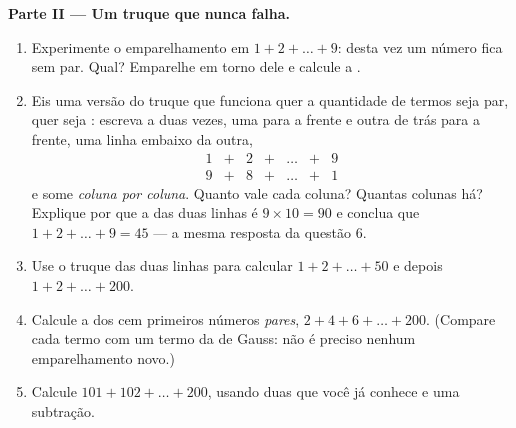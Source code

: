 \begin{problem}
\medskip
\noindent\textbf{Parte II --- Um truque que nunca falha.}
\begin{enumerate}[resume]
  \item Experimente o emparelhamento em $1 + 2 + \dots + 9$: desta vez um
        número fica sem par. Qual? Emparelhe em torno dele e calcule a
        .
  \item Eis uma versão do truque que funciona quer a quantidade de termos
        seja par, quer seja : escreva a  duas vezes, uma para a
        frente e outra de trás para a frente, uma linha embaixo da
        outra,
        \[
        \begin{array}{ccccccc}
        1 & + & 2 & + & \dots & + & 9 \\
        9 & + & 8 & + & \dots & + & 1
        \end{array}
        \]
        e some \emph{coluna por coluna}. Quanto vale cada coluna? Quantas
        colunas há? Explique por que a  das duas linhas é
        $9 \times 10 = 90$ e conclua que $1 + 2 + \dots + 9 = 45$ --- a
        mesma resposta da questão 6.
  \item Use o truque das duas linhas para calcular $1 + 2 + \dots + 50$
        e depois $1 + 2 + \dots + 200$.
  \item Calcule a  dos cem primeiros números \emph{pares},
        $2 + 4 + 6 + \dots + 200$. (Compare cada termo com um termo da
         de Gauss: não é preciso nenhum emparelhamento novo.)
  \item Calcule $101 + 102 + \dots + 200$, usando duas  que você já
        conhece e uma subtração.
\end{enumerate}


\end{problem}
